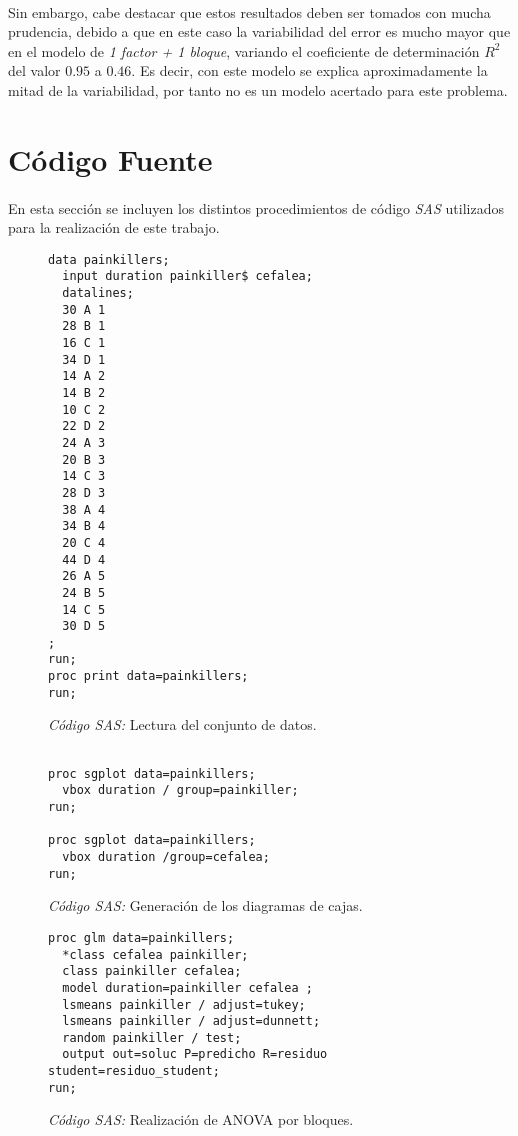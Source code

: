 \documentclass[11pt]{article}
\begin{document}
      \paragraph{}
      Sin embargo, cabe destacar que estos resultados deben ser tomados con mucha prudencia, debido a que en este caso la variabilidad  del error es mucho mayor que en el modelo de \emph{1 factor + 1 bloque}, variando el coeficiente de determinación $R^2$ del valor $0.95$ a $0.46$. Es decir, con este modelo se explica aproximadamente la mitad de la variabilidad, por tanto no es un modelo acertado para este problema.

  \section{Código Fuente}

    \paragraph{}
    En esta sección se incluyen los distintos procedimientos de código \emph{SAS} utilizados para la realización de este trabajo.

    \begin{figure}[H]
      \centering
      \begin{verbatim}
data painkillers;
  input duration painkiller$ cefalea;
  datalines;
  30 A 1
  28 B 1
  16 C 1
  34 D 1
  14 A 2
  14 B 2
  10 C 2
  22 D 2
  24 A 3
  20 B 3
  14 C 3
  28 D 3
  38 A 4
  34 B 4
  20 C 4
  44 D 4
  26 A 5
  24 B 5
  14 C 5
  30 D 5
;
run;
proc print data=painkillers;
run;
      \end{verbatim}
      \caption{\emph{Código SAS:} Lectura del conjunto de datos.}
      \label{code:sas_1}
    \end{figure}

    \begin{figure}[H]
      \centering
      \begin{verbatim}

proc sgplot data=painkillers;
  vbox duration / group=painkiller;
run;

proc sgplot data=painkillers;
  vbox duration /group=cefalea;
run;
      \end{verbatim}
      \caption{\emph{Código SAS:} Generación de los diagramas de cajas.}
      \label{code:sas_2}
    \end{figure}

    \begin{figure}[H]
      \centering
      \begin{verbatim}
proc glm data=painkillers;
  *class cefalea painkiller;
  class painkiller cefalea;
  model duration=painkiller cefalea ;
  lsmeans painkiller / adjust=tukey;
  lsmeans painkiller / adjust=dunnett;
  random painkiller / test;
  output out=soluc P=predicho R=residuo student=residuo_student;
run;
      \end{verbatim}
      \caption{\emph{Código SAS:} Realización de ANOVA por bloques.}
      \label{code:sas_3}
    \end{figure}
\end{document}
